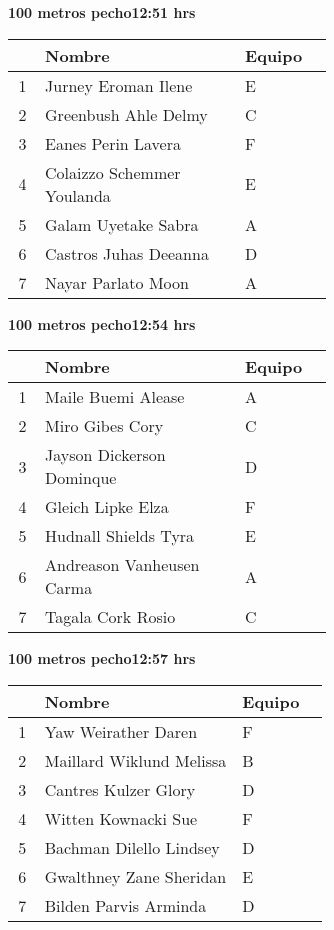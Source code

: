 \begin{minipage}{0.95\linewidth}
\begin{center}
\textbf{
100 metros pecho\hspace{1cm}12:51 hrs}
\end{center}
\begin{tabular}{cp{0.63\linewidth}l}
\hline
& \textbf{Nombre} & \textbf{Equipo} \\ \hline
1 & Jurney Eroman Ilene & E \\ 
2 & Greenbush Ahle Delmy & C \\ 
3 & Eanes Perin Lavera & F \\ 
4 & Colaizzo Schemmer Youlanda & E \\ 
5 & Galam Uyetake Sabra & A \\ 
6 & Castros Juhas Deeanna & D \\ 
7 & Nayar Parlato Moon & A \\ 
\end{tabular}
\end{minipage}
\begin{minipage}{0.95\linewidth}
\begin{center}
\textbf{
100 metros pecho\hspace{1cm}12:54 hrs}
\end{center}
\begin{tabular}{cp{0.63\linewidth}l}
\hline
& \textbf{Nombre} & \textbf{Equipo} \\ \hline
1 & Maile Buemi Alease & A \\ 
2 & Miro Gibes Cory & C \\ 
3 & Jayson Dickerson Dominque & D \\ 
4 & Gleich Lipke Elza & F \\ 
5 & Hudnall Shields Tyra & E \\ 
6 & Andreason Vanheusen Carma & A \\ 
7 & Tagala Cork Rosio & C \\ 
\end{tabular}
\end{minipage}
\begin{minipage}{0.95\linewidth}
\begin{center}
\textbf{
100 metros pecho\hspace{1cm}12:57 hrs}
\end{center}
\begin{tabular}{cp{0.63\linewidth}l}
\hline
& \textbf{Nombre} & \textbf{Equipo} \\ \hline
1 & Yaw Weirather Daren & F \\ 
2 & Maillard Wiklund Melissa & B \\ 
3 & Cantres Kulzer Glory & D \\ 
4 & Witten Kownacki Sue & F \\ 
5 & Bachman Dilello Lindsey & D \\ 
6 & Gwalthney Zane Sheridan & E \\ 
7 & Bilden Parvis Arminda & D \\ 
\end{tabular}
\end{minipage}
